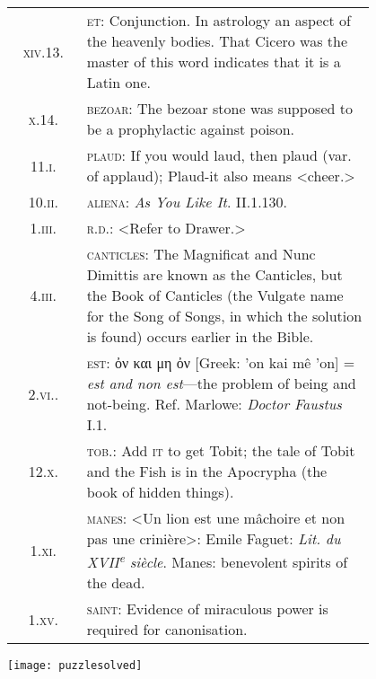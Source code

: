 \begin{longtable} {c p{0.8\linewidth}}
\textsc{xiv}.13. & \textsc{et}: Conjunction. In astrology an aspect of the heavenly bodies. That Cicero was the master of this word indicates that it is a Latin one.\\

\textsc{x}.14. & \textsc{bezoar}: The bezoar stone was supposed to be a prophylactic against poison.\\

11.\textsc{i.} & \textsc{plaud}: If you would laud, then plaud (var. of applaud); Plaud-it also means <cheer.>\\

10.\textsc{ii.} &  \textsc{aliena}: \textit{As You Like It}. \textsc{II}.1.130.\\

1.\textsc{iii.} &  \textsc{r.d.}: <Refer to Drawer.>\\

4.\textsc{iii.} &  \textsc{canticles}: The Magnificat and Nunc Dimittis are known as the Canticles, but the Book of Canticles (the Vulgate name for the Song of Songs, in which the solution is found) occurs earlier in the Bible.\\

2.\textsc{vi.}. &  \textsc{est}: ὀν και μη ὀν [Greek: 'on kai mê 'on] = \textit{est and non est}—the problem of being and not-being. Ref. Marlowe: \textit{Doctor Faustus} \textsc{I}.1.\\

12.\textsc{x.} &  \textsc{tob}.: Add \textsc{it} to get Tobit; the tale of Tobit and the Fish is in the Apocrypha (the book of hidden things).\\

1.\textsc{xi.} &  \textsc{manes}: <Un lion est une mâchoire et non pas une crinière>: Emile Faguet: \textit{Lit. du \textsc{XVII}\textsuperscript{e} siècle}. Manes: benevolent spirits of the dead.\\

1.\textsc{xv}. &  \textsc{saint}: Evidence of miraculous power is required for canonisation.\\
\end{longtable}

\texttt{[image: puzzlesolved]}